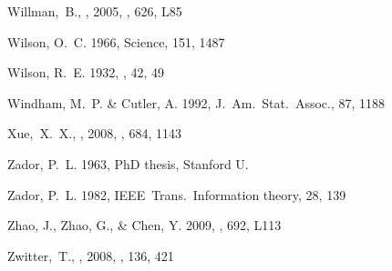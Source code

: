 \begin{thebibliography}{99}
  Willman,~B., \etal, 2005,
  \apjl, 626, L85

{Wilson}, O.~C. 1966, Science, 151, 1487

{Wilson}, R.~E. 1932, \aj, 42, 49

{Windham}, M.~P. \& {Cutler}, A. 1992, {J.~Am.~Stat.~Assoc.}, 87, 1188

 Xue,~X.~X., \etal, 2008, 
  \apj, 684, 1143

{Zador}, P.~L. 1963, PhD thesis, Stanford U.

{Zador}, P.~L. 1982, {IEEE~Trans.~Information theory}, 28, 139

{Zhao}, J., {Zhao}, G., \& {Chen}, Y. 2009, \apjl, 692, L113

  Zwitter,~T., \etal, 2008, \aj, 136, 421


\end{thebibliography}
